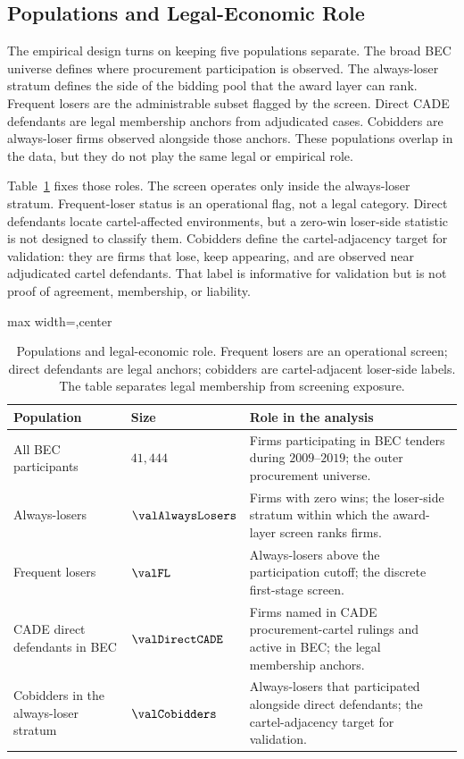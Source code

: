 \subsection{Populations and Legal-Economic Role}
\label{sec:award_populations}

The empirical design turns on keeping five populations
separate. The broad BEC universe defines where procurement
participation is observed. The always-loser stratum defines the
side of the bidding pool that the award layer can rank.
Frequent losers are the administrable subset flagged by the
screen. Direct CADE defendants are legal membership anchors from
adjudicated cases. Cobidders are always-loser firms observed
alongside those anchors. These populations overlap in the data,
but they do not play the same legal or empirical role.

Table~\ref{tab:populations_v18} fixes those roles. The screen
operates only inside the always-loser stratum. Frequent-loser
status is an operational flag, not a legal category. Direct
defendants locate cartel-affected environments, but a zero-win
loser-side statistic is not designed to classify them. Cobidders
define the cartel-adjacency target for validation: they are
firms that lose, keep appearing, and are observed near
adjudicated cartel defendants. That label is informative for
validation but is not proof of agreement, membership, or
liability.

\begin{table}[htbp]
\centering
\caption{Populations and legal-economic role. Frequent losers
are an operational screen; direct defendants are legal anchors;
cobidders are cartel-adjacent loser-side labels. The table
separates legal membership from screening exposure.}
\label{tab:populations_v18}
\footnotesize
\begin{adjustbox}{max width=\textwidth,center}
\begin{tabular}{p{4.0cm}p{2.1cm}p{7.0cm}}
\toprule
Population & Size & Role in the analysis \\
\midrule
All BEC participants & $41{,}444$ & Firms participating in BEC tenders during $2009$--$2019$; the outer procurement universe. \\
Always-losers & $\valAlwaysLosers$ & Firms with zero wins; the loser-side stratum within which the award-layer screen ranks firms. \\
Frequent losers & $\valFL$ & Always-losers above the participation cutoff; the discrete first-stage screen. \\
CADE direct defendants in BEC & $\valDirectCADE$ & Firms named in CADE procurement-cartel rulings and active in BEC; the legal membership anchors. \\
Cobidders in the always-loser stratum & $\valCobidders$ & Always-losers that participated alongside direct defendants; the cartel-adjacency target for validation. \\
\bottomrule
\end{tabular}
\end{adjustbox}
\end{table}

